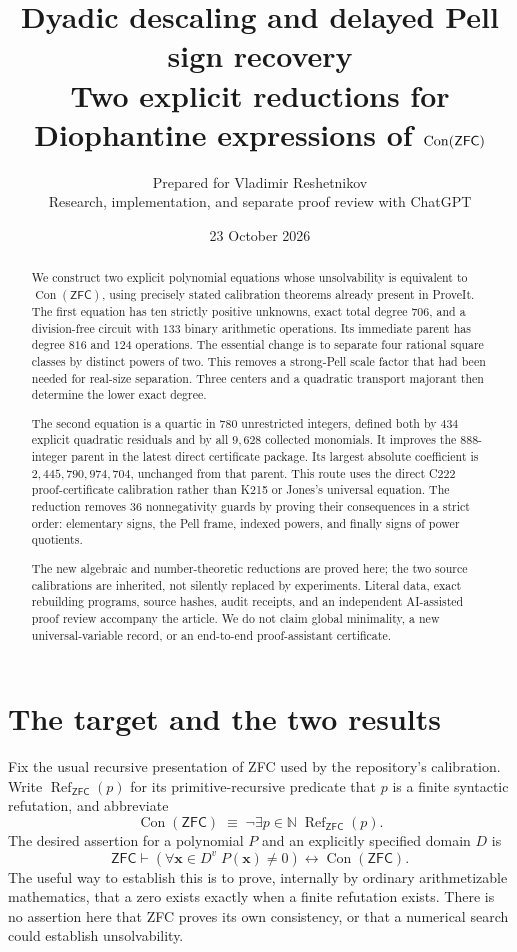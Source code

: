\documentclass[11pt,letterpaper]{article}
\title{\textbf{Dyadic descaling and delayed Pell sign recovery}\\[4pt]
  \large Two explicit reductions for Diophantine expressions of $\Con(\ZFC)$}
\author{Prepared for Vladimir Reshetnikov\\
  \small Research, implementation, and separate proof review with ChatGPT}
\date{23 October 2026}
\newcommand{\N}{\mathbb N}
\newcommand{\Con}{\operatorname{Con}}
\newcommand{\Refut}{\operatorname{Ref}}
\newcommand{\ZFC}{\mathsf{ZFC}}
\theoremstyle{definition}
\theoremstyle{remark}
\numberwithin{equation}{section}
\begin{document}
\maketitle
\thispagestyle{empty}
\begin{abstract}
We construct two explicit polynomial equations whose unsolvability is
equivalent to $\Con(\ZFC)$, using precisely stated calibration theorems
already present in ProveIt. The first equation has ten strictly positive
unknowns, exact total degree $706$, and a division-free circuit with $133$
binary arithmetic operations. Its immediate parent has degree $816$ and
$124$ operations. The essential change is to separate four rational square
classes by distinct powers of two. This removes a strong-Pell scale factor
that had been needed for real-size separation. Three centers and a quadratic
transport majorant then determine the lower exact degree.

The second equation is a quartic in $780$ unrestricted integers, defined
both by $434$ explicit quadratic residuals and by all $9,628$ collected
monomials. It improves the $888$-integer parent in the latest direct
certificate package. Its largest absolute coefficient is
$2,445,790,974,704$, unchanged from that parent. This route uses the direct
C222 proof-certificate calibration rather than K215 or Jones's universal
equation. The reduction removes $36$ nonnegativity guards by proving their
consequences in a strict order: elementary signs, the Pell frame, indexed
powers, and finally signs of power quotients.

The new algebraic and number-theoretic reductions are proved here;
the two source calibrations are inherited, not silently replaced by
experiments. Literal data, exact rebuilding programs, source hashes,
audit receipts, and an independent AI-assisted proof review accompany
the article. We do not claim global minimality, a new universal-variable
record, or an end-to-end proof-assistant certificate.
\end{abstract}
\clearpage
\tableofcontents
\clearpage

\section{The target and the two results}
\label{sec:overview}

Fix the usual recursive presentation of ZFC used by the repository's
calibration. Write $\Refut_{\ZFC}(p)$ for its primitive-recursive predicate
that $p$ is a finite syntactic refutation, and abbreviate
\[
  \Con(\ZFC)\;\equiv\;\neg\exists p\in\N\;\Refut_{\ZFC}(p).
\]
The desired assertion for a polynomial $P$ and an explicitly specified
domain $D$ is
\begin{equation}\label{eq:target}
 \ZFC\vdash
 \left(\forall \boldsymbol x\in D^v\;P(\boldsymbol x)\ne0\right)
 \longleftrightarrow \Con(\ZFC).
\end{equation}
The useful way to establish this is to prove, internally by ordinary
arithmetizable mathematics, that a zero exists exactly when a finite
refutation exists. There is no assertion here that ZFC proves its own
consistency, or that a numerical search could establish unsolvability.
\end{document}
